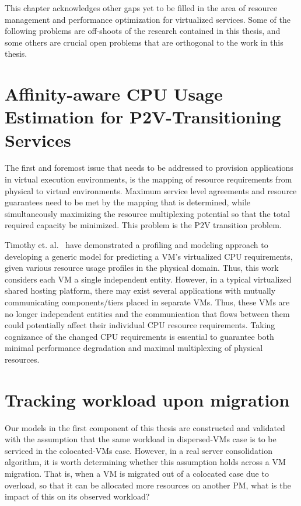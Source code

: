 

This chapter acknowledges other gaps yet to be filled in the area of
resource management and performance optimization for virtualized
services. 
Some of the following problems are off-shoots of the research
contained in this thesis, and some others are crucial open problems
that are orthogonal to the work in this thesis. 

\section{Affinity-aware CPU Usage Estimation for P2V-Transitioning Services}
The first and foremost issue that needs to be addressed to provision
applications in virtual execution environments, is the mapping of resource
requirements from physical to virtual environments.
Maximum service level agreements and resource guarantees need to be met
by the mapping that is determined, while simultaneously
maximizing the resource multiplexing potential so that the total required
capacity be minimized. This problem is the P2V transition problem.

Timothy et. al.~\cite{profiling-and-modeling} have demonstrated a profiling
and modeling approach to developing a generic model for predicting a VM's
virtualized CPU requirements, given various resource usage profiles in the
physical domain. Thus, this work considers each VM a single independent
entity. However, in a typical virtualized shared hosting platform, there
may exist several applications with mutually communicating components/tiers
placed in separate VMs. Thus, these VMs are no longer independent entities
and the communication that flows between them could potentially affect
their individual CPU resource requirements. Taking cognizance of the
changed CPU requirements is essential to guarantee both minimal performance
degradation and maximal multiplexing of physical resources.




\section{Tracking workload upon migration}
Our models in the first component of this thesis are constructed and 
validated with the assumption that
the same workload in dispersed-VMs case is to be serviced
in the colocated-VMs case. However, in a real server consolidation
algorithm, it is worth determining whether this assumption holds across
a VM migration. That is, when a VM is migrated out of a colocated
case due to overload, so that it can be allocated more resources 
on another PM, what is the impact of this on its observed workload?

